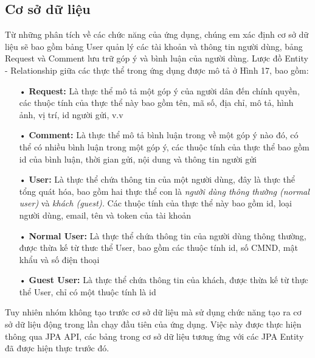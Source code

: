 \documentclass[a4paper]{article}
\begin{document}
\subsection{Cơ sở dữ liệu}
Từ những phân tích về các chức năng của ứng dụng, chúng em xác định cơ sở dữ liệu sẽ bao gồm bảng User quản lý các tài khoản và thông tin người dùng, bảng Request và Comment lưu trữ góp ý và bình luận của người dùng. Lược đồ Entity - Relationship giữa các thực thể trong ứng dụng được mô tả ở Hình 17, bao gồm:
\begin{itemize}
\item[•]\textbf{Request: }Là thực thể mô tả một góp ý của người dân đến chính quyền, các thuộc tính của thực thể này bao gồm tên, mã số, địa chỉ, mô tả, hình ảnh, vị trí, id người gửi, v.v
\item[•]\textbf{Comment: }Là thực thể mô tả bình luận trong về một góp ý nào đó, có thể có nhiều bình luận trong một góp ý, các thuộc tính của thực thể bao gồm id của bình luận, thời gian gửi, nội dung và thông tin người gửi
\item[•]\textbf{User: }Là thực thể chứa thông tin của một người dùng, đây là thực thể tổng quát hóa, bao gồm hai thực thể con là \textit{người dùng thông thường (normal user)} và \textit{khách (guest).} Các thuộc tính của thực thể này bao gồm id, loại người dùng, email, tên và token của tài khoản
\item[•]\textbf{Normal User: }Là thực thể chứa thông tin của người dùng thông thường, được thừa kế từ thưc thể User, bao gồm các thuộc tính id, số CMND, mật khẩu và số điện thoại
\item[•]\textbf{Guest User: }Là thực thể chứa thông tin của khách, được thừa kế từ thực thể User, chỉ có một thuộc tính là id
\end{itemize}
Tuy nhiên nhóm không tạo trước cơ sở dữ liệu mà sử dụng chức năng tạo ra cơ sở dữ liệu động trong lần chạy đầu tiên của ứng dụng. Việc này được thực hiện thông qua JPA API, các bảng trong cơ sở dữ liệu tương ứng với các JPA Entity đã được hiện thực trước đó.
\end{document}
